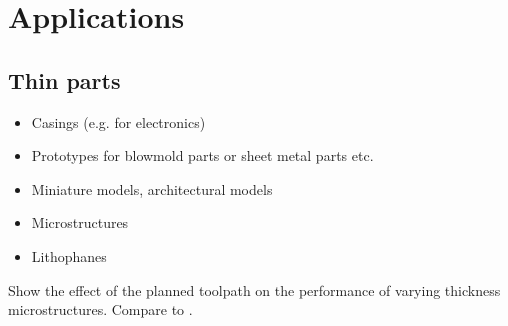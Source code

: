 \section{Applications}

\subsection{Thin parts}
\begin{itemize}
\item Casings (e.g. for electronics)
\item Prototypes for blowmold parts or sheet metal parts etc.
\item Miniature models, architectural models
\item Microstructures
\item Lithophanes
\end{itemize}

Show the effect of the planned toolpath on the performance of varying thickness microstructures.
Compare to \cite{bates2018compressive}.


